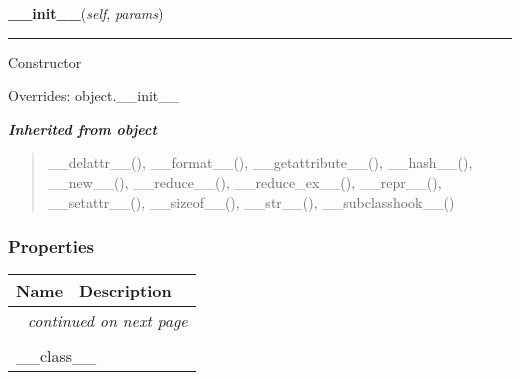     \vspace{0.5ex}

\hspace{.8\funcindent}\begin{boxedminipage}{\funcwidth}

    \raggedright \textbf{\_\_init\_\_}(\textit{self}, \textit{params})

    \vspace{-1.5ex}

    \rule{\textwidth}{0.5\fboxrule}
\setlength{\parskip}{2ex}
    Constructor

\setlength{\parskip}{1ex}
      Overrides: object.\_\_init\_\_

    \end{boxedminipage}


\large{\textbf{\textit{Inherited from object}}}

\begin{quote}
\_\_delattr\_\_(), \_\_format\_\_(), \_\_getattribute\_\_(), \_\_hash\_\_(), \_\_new\_\_(), \_\_reduce\_\_(), \_\_reduce\_ex\_\_(), \_\_repr\_\_(), \_\_setattr\_\_(), \_\_sizeof\_\_(), \_\_str\_\_(), \_\_subclasshook\_\_()
\end{quote}


  \subsubsection{Properties}

    \vspace{-1cm}
\hspace{\varindent}\begin{longtable}{|p{\varnamewidth}|p{\vardescrwidth}|l}
\cline{1-2}
\cline{1-2} \centering \textbf{Name} & \centering \textbf{Description}& \\
\cline{1-2}
\endhead\cline{1-2}\multicolumn{3}{r}{\small\textit{continued on next page}}\\\endfoot\cline{1-2}
\endlastfoot\multicolumn{2}{|l|}{\textit{Inherited from object}}\\
\multicolumn{2}{|p{\varwidth}|}{\raggedright \_\_class\_\_}\\
\cline{1-2}
\end{longtable}



